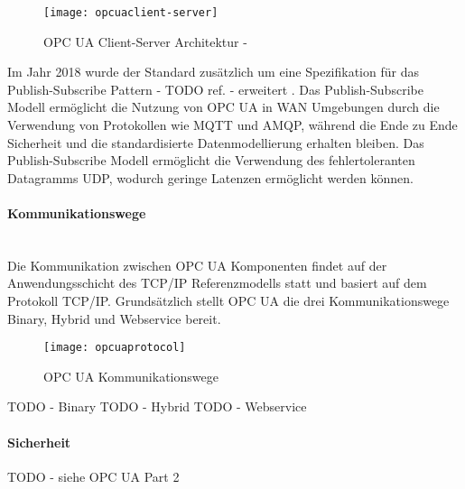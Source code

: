 \begin{figure}[h]
  \centering
  \texttt{[image: opcuaclient-server]}
  \caption{OPC UA Client-Server Architektur - \cite{opcpt1}} 
  \label{Kap2:OPC UA Client-Server Architektur}
\end{figure}

Im Jahr 2018 wurde der Standard zusätzlich um eine Spezifikation für das Publish-Subscribe Pattern - TODO ref. - erweitert \cite{hoppe2018}. Das Publish-Subscribe Modell ermöglicht die Nutzung von \ac{OPC UA} in \ac{WAN} Umgebungen durch die Verwendung von Protokollen wie \ac{MQTT} und \ac{AMQP}, während die Ende zu Ende Sicherheit und die standardisierte Datenmodellierung erhalten bleiben. Das Publish-Subscribe Modell ermöglicht die Verwendung des fehlertoleranten Datagramms \ac{UDP}, wodurch geringe Latenzen ermöglicht werden können. 

\paragraph{Kommunikationswege}\mbox{}\\
Die Kommunikation zwischen \ac{OPC UA} Komponenten findet auf der Anwendungsschicht des \ac{TCP}/\ac{IP} Referenzmodells statt und basiert auf dem Protokoll \ac{TCP}/\ac{IP}. Grundsätzlich stellt \ac{OPC UA} die drei Kommunikationswege Binary, Hybrid und Webservice bereit.

\begin{figure}[h]
  \centering
  \texttt{[image: opcuaprotocol]}
  \caption{OPC UA Kommunikationswege} 
  \label{Kap2:OPC UA Kommunikationswege}
\end{figure}

\clearpage

TODO - Binary
TODO - Hybrid
TODO - Webservice

\paragraph{Sicherheit}
TODO - siehe OPC UA Part 2


